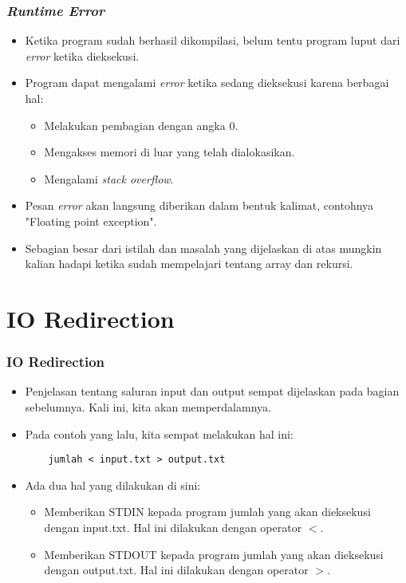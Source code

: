 \begin{frame}
\frametitle{\textit{Runtime Error}}
\begin{itemize}
  \item Ketika program sudah berhasil dikompilasi, belum tentu program luput dari \textit{error} ketika dieksekusi.
  \item Program dapat mengalami \textit{error} ketika sedang dieksekusi karena berbagai hal:
  \begin{itemize}
    \item Melakukan pembagian dengan angka 0.
    \item Mengakses memori di luar yang telah dialokasikan.
    \item Mengalami \textit{stack overflow}.
  \end{itemize}
  \item Pesan \textit{error} akan langsung diberikan dalam bentuk kalimat, contohnya "Floating point exception".
  \item Sebagian besar dari istilah dan masalah yang dijelaskan di atas mungkin kalian hadapi ketika sudah mempelajari tentang array dan rekursi.
\end{itemize}
\end{frame}

\section{IO Redirection}
\frame{\sectionpage}

\begin{frame}[fragile]
\frametitle{IO Redirection}
\begin{itemize}
  \item Penjelasan tentang saluran input dan output sempat dijelaskan pada bagian sebelumnya. Kali ini, kita akan memperdalamnya.
  \item Pada contoh yang lalu, kita sempat melakukan hal ini:
  \begin{lstlisting}
    jumlah < input.txt > output.txt
  \end{lstlisting}
  \item Ada dua hal yang dilakukan di sini:
  \begin{itemize}
    \item Memberikan STDIN kepada program jumlah yang akan dieksekusi dengan input.txt. Hal ini dilakukan dengan operator $<$.
    \item Memberikan STDOUT kepada program jumlah yang akan dieksekusi dengan output.txt. Hal ini dilakukan dengan operator $>$.
  \end{itemize}
\end{itemize}
\end{frame}


